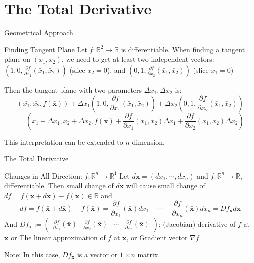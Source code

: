 \documentclass[a4paper,11pt]{article}
\newcommand{\bb}{\mathbb}
\newcommand{\bd}{\mathbf}
\newcommand{\p}{\partial}
\begin{document}
\section{The Total Derivative} %
\label{sec:the_total_derivative}

\begin{frame}[t]{Geometrical Approach}
	\begin{block}{Finding Tangent Plane}
		Let $f:\bb{R}^2\rightarrow \bb{R}$ is differentiable. When finding a tangent plane on $(\bar x_1, \bar x_2)$, we need to get at least two independent vectors: $\left(1,0,\frac{\p f}{\p x_1}(\bar x_1, \bar x_2)\right)$ (slice $x_2=0$), and $\left(0,1,\frac{\p f}{\p x_2}(\bar x_1, \bar x_2)\right)$ (slice $x_1=0$)

		Then the tangent plane with two parameters $\Delta x_1, \Delta x_2$ is:\[
			(\bar {x_1}, \bar{x_2}, f(\bar {\bd x})) + \Delta x_1\left(1,0,\frac{\p f}{\p x_1}(\bar x_1, \bar x_2) \right)+\Delta x_2\left(0,1,\frac{\p f}{\p x_2}(\bar x_1, \bar x_2)\right)
		\]\[
			=\left(\bar{ x_1}+\Delta x_1 , \bar{x_2}+\Delta x_2, f(\bar {\bd x})+ \frac{\p f}{\p x_1}(\bar x_1, \bar x_2)\Delta x_1 + \frac{\p f}{\p x_2}(\bar x_1, \bar x_2)\Delta x_2 \right)
		\]
	\end{block}
	This interpretation can be extended to $n$ dimension.
\end{frame}

\begin{frame}[t]{The Total Derivative}
	\begin{block}
		{Changes in All Direction: $f:\bb{R}^n\rightarrow \bb{R}^1$}
		Let $d \bd x = (d x_1, \cdots, d x_n)$ and $f:\bb{R}^n\rightarrow\bb{R}$, differentiable. Then small change of $d\bd x$ will cause small change of $df=f(\bar{\bd x} + d \bar{\bd x}) - f(\bar{\bd x})\in\bb{R}$ and \[
			df = f(\bar{\bd x} + d \bar{\bd x}) - f(\bar{\bd x}) = \frac{\p f}{\p x_1}(\bar{\bd x})dx_1 + \cdots +\frac{\p f}{\p x_n}(\bar{\bd x})dx_n= Df_{\bd x} d\bd x
		\]
		And $Df_{\bd x}:=\begin{pmatrix}
			\frac{\p f}{\p x_1}(\bar{\bd x}) & \frac{\p f}{\p x_2}(\bar{\bd x}) &\cdots & \frac{\p f}{\p x_n}(\bar{\bd x})
		\end{pmatrix}$: (Jacobian) derivative of $f$ at $\bar{\bd x}$ or The linear approximation of $f$ at $\bar{\bd x}$, or Gradient vector $\nabla f$
	\end{block}
	Note: In this case, $Df_{\bd x}$ is a vector or $1\times n$ matrix.
\end{frame}
\end{document}
